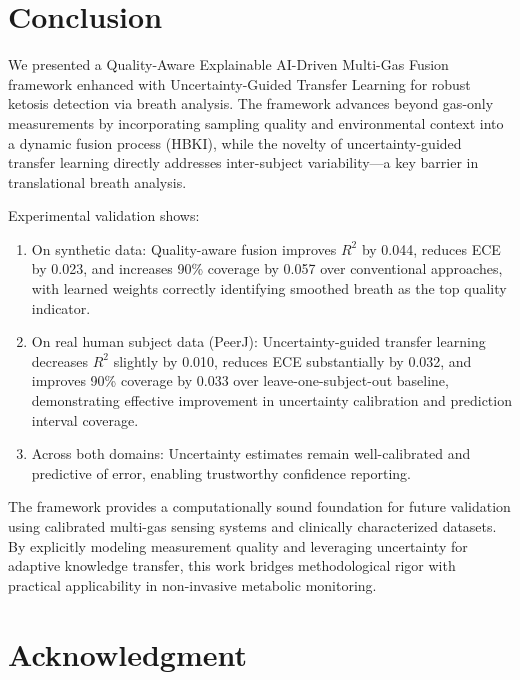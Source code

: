 \documentclass{ieeeaccess}
\begin{document}

\section{Conclusion}
\label{sec:conclusion}

We presented a Quality-Aware Explainable AI-Driven Multi-Gas Fusion framework enhanced with Uncertainty-Guided Transfer Learning for robust ketosis detection via breath analysis. The framework advances beyond gas-only measurements by incorporating sampling quality and environmental context into a dynamic fusion process (HBKI), while the novelty of uncertainty-guided transfer learning directly addresses inter-subject variability—a key barrier in translational breath analysis.

Experimental validation shows:
\begin{enumerate}
\item On synthetic data: Quality-aware fusion improves $R^2$ by 0.044, reduces ECE by 0.023, and increases 90\% coverage by 0.057 over conventional approaches, with learned weights correctly identifying smoothed breath as the top quality indicator.
\item On real human subject data (PeerJ): Uncertainty-guided transfer learning decreases $R^2$ slightly by 0.010, reduces ECE substantially by 0.032, and improves 90\% coverage by 0.033 over leave-one-subject-out baseline, demonstrating effective improvement in uncertainty calibration and prediction interval coverage.
\item Across both domains: Uncertainty estimates remain well-calibrated and predictive of error, enabling trustworthy confidence reporting.
\end{enumerate}
The framework provides a computationally sound foundation for future validation using calibrated multi-gas sensing systems and clinically characterized datasets. By explicitly modeling measurement quality and leveraging uncertainty for adaptive knowledge transfer, this work bridges methodological rigor with practical applicability in non-invasive metabolic monitoring.


\section*{Acknowledgment}
\end{document}
